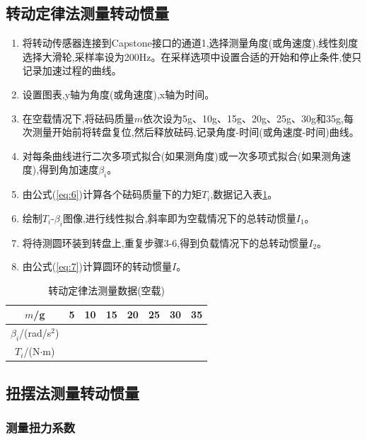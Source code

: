 \documentclass[UTF8]{ctexart}
\begin{document}
    \subsection{转动定律法测量转动惯量}
    
    \begin{enumerate}
    \item 将转动传感器连接到Capstone接口的通道1,选择测量角度(或角速度),线性刻度选择大滑轮,采样率设为200Hz。在采样选项中设置合适的开始和停止条件,使只记录加速过程的曲线。
    \item 设置图表,y轴为角度(或角速度),x轴为时间。  
    \item 在空载情况下,将砝码质量$m$依次设为5g、10g、15g、20g、25g、30g和35g,每次测量开始前将转盘复位,然后释放砝码,记录角度-时间(或角速度-时间)曲线。
    \item 对每条曲线进行二次多项式拟合(如果测角度)或一次多项式拟合(如果测角速度),得到角加速度$\beta_i$。
    \item 由公式(\ref{eq:6})计算各个砝码质量下的力矩$T_i$,数据记入表\ref{tab:2}。
    \item 绘制$T_i$-$\beta_i$图像,进行线性拟合,斜率即为空载情况下的总转动惯量$I_1$。
    \item 将待测圆环装到转盘上,重复步骤3-6,得到负载情况下的总转动惯量$I_2$。
    \item 由公式(\ref{eq:7})计算圆环的转动惯量$I$。
    \end{enumerate}
    
    \begin{table}[htbp]
    \centering
    \caption{转动定律法测量数据(空载)} \label{tab:2} 
    \begin{tabular}{cccccccc}
    \hline
    $m$/g & 5 & 10 & 15 & 20 & 25 & 30 & 35\\
    \hline
    $\beta_i$/(rad/s$^2$) &  &  &  &  &  &  & \\  
    $T_i$/(N$\cdot$m) &  &  &  &  &  &  & \\
    \hline
    \end{tabular}
    \end{table}
    
    \subsection{扭摆法测量转动惯量}
    
    \subsubsection{测量扭力系数}
    
\end{document}
